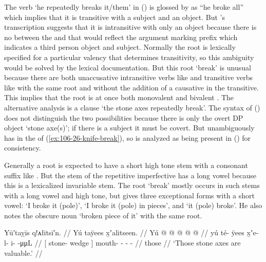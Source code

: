 The verb  ‘he repeatedly breaks it/them’ in (\lastx) is glossed by \citeauthor{swanton:1909} as “he broke all” which implies that it is transitive with a subject and an object.
But \citeauthor{swanton:1909}’s transcription  suggests that it is intransitive with only an object because there is no  between the  and  that would reflect the argument marking prefix  which indicates a third person object and subject.
Normally the root is lexically specified for a particular valency that determines transitivity, so this ambiguity would be solved by the lexical documentation.
But this root  ‘break’ is unusual because there are both unaccusative intransitive verbs like  and transitive verbs like  with the same root and without the addition of a causative  in the transitive.
This implies that the root is at once both monovalent  and bivalent .
The alternative analysis is a clause  ‘the stone axes repeatedly break’.
The syntax of (\lastx) does not distinguish the two possibilities because there is only the overt DP object  ‘stone axe(s)’; if there is a subject it must be covert.
But \citeauthor{swanton:1909} unambiguously has  in the   of (\ref{ex:106-26-knife-break}), so  is analyzed as being present in (\lastx) for consistency.

Generally a  root is expected to have a short high tone  stem with a consonant suffix like .
But the stem  of the repetitive imperfective  has a long vowel because this is a lexicalized invariable stem.
The root  ‘break’ mostly occurs in such stems with a long vowel and high tone, but \textcite[08/201]{leer:1973} gives three exceptional forms with a short vowel:  ‘I broke it (pole)’,  ‘I broke it (pole) in pieces’, and  ‘it (pole) broke’.
He also notes the obscure noun  ‘broken piece of it’ with the same root.

\ex\label{ex:106-22-axe-expensive}%
%
\begingl
	\glpreamble	Yū′taỵīs q!ᴀłitsī′n. //
	\glpreamble	Yú taÿees x̱ʼalitseen. //
	\gla	{} Yú  @ {} {}  @ {} @ {} @ {} @ {} //
	\glb	{} yú té- ÿees {} x̱ʼe- l- i-  -μμL //
	\glc	{}[  stone- wedge {}] mouth- - -  - //
	\gld	{} those  {} {}  {} {} {} {} //
	\glft	‘Those stone axes are valuable.’
		//
\endgl
\xe

